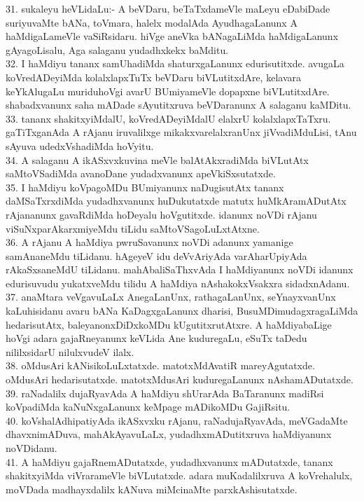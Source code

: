 \documentclass{article}
\begin{document}
31. sukaleyu heVLidaLu:- A beVDaru, beTaTxdameVle maLeyu eDabiDade suriyuvaMte bANa, toVmara, halelx modalAda AyudhagaLanunx A haMdigaLameVle vaSiRsidaru. hiVge aneVka bANagaLiMda haMdigaLanunx gAyagoLisalu, Aga salaganu yudadhxkekx baMditu.\\
32. I haMdiyu tananx samUhadiMda shaturxgaLanunx edurisutitxde. avugaLa koVredADeyiMda kolalxlapxTuTx beVDaru biVLutitxdAre, kelavara keYkAlugaLu muriduhoVgi avarU BUmiyameVle dopapxne biVLutitxdAre. shabadxvanunx saha mADade sAyutitxruva beVDaranunx A salaganu kaMDitu.\\
33. tananx shakitxyiMdalU, koVredADeyiMdalU elalxrU kolalxlapxTaTxru. gaTiTxganAda A rAjanu iruvalilxge mikakxvarelalxranUnx jiVvadiMduLisi, tAnu sAyuva udedxVshadiMda hoVyitu.\\
34. A salaganu A ikASxvxkuvina meVle balAtAkxradiMda biVLutAtx saMtoVSadiMda avanoDane yudadxvanunx apeVkiSxsutatxde.\\
35. I haMdiyu koVpagoMDu BUmiyanunx naDugisutAtx tananx daMSaTxrxdiMda yudadhxvanunx huDukutatxde matutx huMkAramADutAtx rAjananunx gavaRdiMda hoDeyalu hoVgutitxde. idanunx noVDi rAjanu viSuNxparAkarxmiyeMdu tiLidu saMtoVSagoLuLxtAtxne.\\
36. A rAjanu A haMdiya pwruSavanunx noVDi adanunx yamanige samAnaneMdu tiLidanu. hAgeyeV idu deVvAriyAda varAharUpiyAda rAkaSxsaneMdU tiLidanu. mahAbaliSaThxvAda I haMdiyanunx noVDi idanunx edurisuvudu yukatxveMdu tilidu A haMdiya nAshakokxVsakxra sidadxnAdanu.\\
37. anaMtara veVgavuLaLx AnegaLanUnx, rathagaLanUnx, seYnayxvanUnx kaLuhisidanu avaru bANa KaDagxgaLanunx dharisi, BusuMDimudagxragaLiMda hedarisutAtx, baleyanonxDiDxkoMDu kUgutitxrutAtxre. A haMdiyabaLige hoVgi adara gajaRneyanunx keVLida Ane kuduregaLu, eSuTx taDedu nililxsidarU nilulxvudeV ilalx.\\
38. oMdusAri kANisikoLuLxtatxde. matotxMdAvatiR mareyAgutatxde. oMdusAri hedarisutatxde. matotxMdusAri kuduregaLanunx nAshamADutatxde.\\
39. raNadalilx dujaRyavAda A haMdiyu shUrarAda BaTaranunx madiRsi koVpadiMda kaNuNxgaLanunx keMpage mADikoMDu GajiRsitu.\\
40. koVshalAdhipatiyAda ikASxvxku rAjanu, raNadujaRyavAda, meVGadaMte dhavxnimADuva, mahAkAyavuLaLx, yudadhxmADutitxruva haMdiyanunx noVDidanu.\\
41. A haMdiyu gajaRnemADutatxde, yudadhxvanunx mADutatxde, tananx shakitxyiMda viVrarameVle biVLutatxde. adara muKadalilxruva A koVrehalulx, moVDada madhayxdalilx kANuva miMcinaMte parxkAshisutatxde.\\
\end{document}
